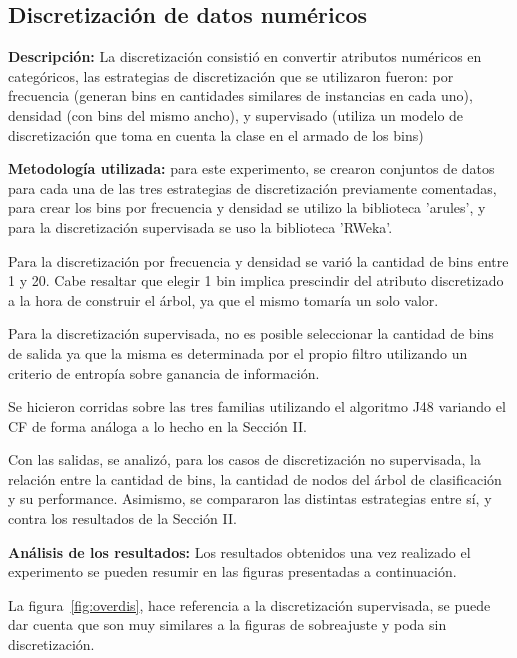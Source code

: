 \subsection{Discretización de datos numéricos}

\textbf{Descripción:} La discretización consistió en convertir atributos numéricos en categóricos, las estrategias
de discretización que se utilizaron fueron: por frecuencia (generan bins en cantidades similares de instancias en cada uno),  densidad
(con bins del mismo ancho), y supervisado (utiliza un modelo de discretización que toma en cuenta la clase en
el armado de los bins) 

\textbf{Metodología utilizada:} para este experimento, se crearon conjuntos de datos para cada
una de las tres estrategias de discretización previamente comentadas, para crear los bins por frecuencia
y densidad se utilizo la biblioteca 'arules', y para la discretización supervisada
se uso la biblioteca 'RWeka'.  

Para la discretización por frecuencia y densidad se varió la cantidad de bins entre 1 y 20.
Cabe resaltar que elegir 1 bin implica prescindir del atributo discretizado a la hora de
construir el árbol, ya que el mismo tomaría un solo valor.

Para la discretización supervisada, no es posible seleccionar la cantidad de bins de salida
ya que la misma es determinada por el propio filtro utilizando un criterio de entropía sobre
ganancia de información.

Se hicieron corridas sobre las tres familias utilizando el algoritmo J48 variando el CF de
forma análoga a lo hecho en la Sección II.

Con las salidas, se analizó, para los casos de discretización no supervisada, la relación
entre la cantidad de bins, la cantidad de nodos del árbol de clasificación y su performance.
Asimismo, se compararon las distintas estrategias entre sí, y contra los resultados de la
Sección II.

\textbf{Análisis de los resultados:} Los resultados obtenidos una vez realizado el experimento
se pueden resumir en las figuras presentadas a continuación.

La figura~\ref{fig:overdis}, hace referencia a la discretización supervisada, se puede
dar cuenta que son muy similares a la figuras de sobreajuste y poda sin discretización.


